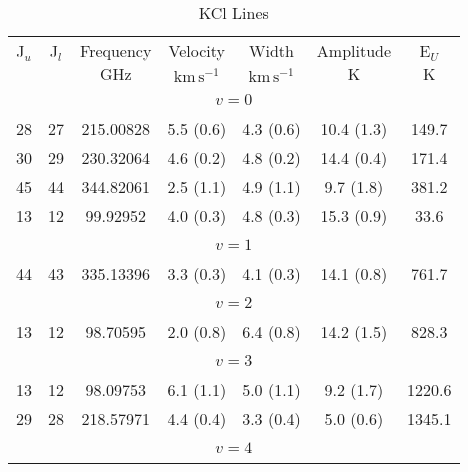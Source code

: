 \begin{table*}[htp]
\centering
\caption{KCl Lines}
\begin{tabular}{ccccccc}
\label{tab:KCl_salt_lines}
 J$_u$ & J$_l$ & Frequency & Velocity & Width & Amplitude & E$_U$ \\
  &  & $\mathrm{GHz}$ & $\mathrm{km\,s^{-1}}$ & $\mathrm{km\,s^{-1}}$ & $\mathrm{K}$ & $\mathrm{K}$ \\
\hline
&\vspace{-0.75em}\\
\multicolumn{7}{c}{$v = 0$} \\
\vspace{-0.75em}\\
 28 & 27 & 215.00828 & 5.5 (0.6) & 4.3 (0.6) & 10.4 (1.3) & 149.7 \\
 30 & 29 & 230.32064 & 4.6 (0.2) & 4.8 (0.2) & 14.4 (0.4) & 171.4 \\
 45 & 44 & 344.82061 & 2.5 (1.1) & 4.9 (1.1) & 9.7 (1.8) & 381.2 \\
 13 & 12 & 99.92952 & 4.0 (0.3) & 4.8 (0.3) & 15.3 (0.9) & 33.6 \\
&\vspace{-0.75em}\\
\multicolumn{7}{c}{$v = 1$} \\
\vspace{-0.75em}\\
 44 & 43 & 335.13396 & 3.3 (0.3) & 4.1 (0.3) & 14.1 (0.8) & 761.7 \\
&\vspace{-0.75em}\\
\multicolumn{7}{c}{$v = 2$} \\
\vspace{-0.75em}\\
 13 & 12 & 98.70595 & 2.0 (0.8) & 6.4 (0.8) & 14.2 (1.5) & 828.3 \\
&\vspace{-0.75em}\\
\multicolumn{7}{c}{$v = 3$} \\
\vspace{-0.75em}\\
 13 & 12 & 98.09753 & 6.1 (1.1) & 5.0 (1.1) & 9.2 (1.7) & 1220.6 \\
 29 & 28 & 218.57971 & 4.4 (0.4) & 3.3 (0.4) & 5.0 (0.6) & 1345.1 \\
&\vspace{-0.75em}\\
\multicolumn{7}{c}{$v = 4$} \\
\vspace{-0.75em}\\

\end{tabular}
\end{table*}
